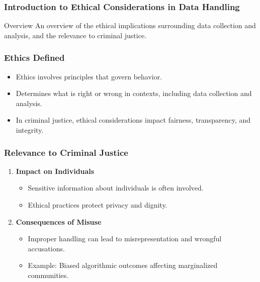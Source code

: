 \documentclass[aspectratio=169]{beamer}
\begin{document}
\frame{\titlepage}

\begin{frame}[fragile]
    \frametitle{Introduction to Ethical Considerations in Data Handling}
    \begin{block}{Overview}
        An overview of the ethical implications surrounding data collection and analysis, and the relevance to criminal justice.
    \end{block}
\end{frame}

\begin{frame}[fragile]
    \frametitle{Ethics Defined}
    \begin{itemize}
        \item Ethics involves principles that govern behavior.
        \item Determines what is right or wrong in contexts, including data collection and analysis.
        \item In criminal justice, ethical considerations impact fairness, transparency, and integrity.
    \end{itemize}
\end{frame}

\begin{frame}[fragile]
    \frametitle{Relevance to Criminal Justice}
    \begin{enumerate}
        \item \textbf{Impact on Individuals}
        \begin{itemize}
            \item Sensitive information about individuals is often involved.
            \item Ethical practices protect privacy and dignity.
        \end{itemize}

        \item \textbf{Consequences of Misuse}
        \begin{itemize}
            \item Improper handling can lead to misrepresentation and wrongful accusations.
            \item Example: Biased algorithmic outcomes affecting marginalized communities.
        \end{itemize}
    \end{enumerate}
\end{frame}
\end{document}
